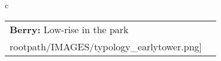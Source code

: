 \begin{table}[H]
        \begin{tabular}{c}
        \begin{tabular}{m{1.5in} m{2in}}
\textbf{Berry:} {Low-rise in the park} & \texttt{[image: \\rootpath/IMAGES/typology\_earlytower.png]}
\end{tabular}\end{tabular}
        \end{table}